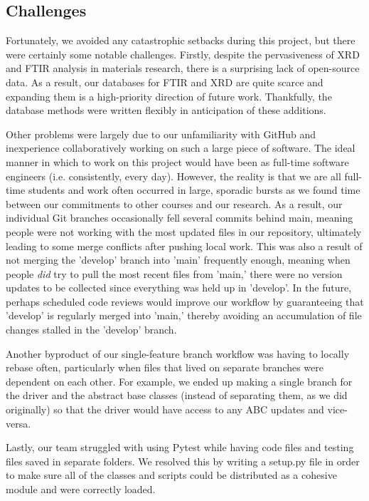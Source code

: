 \documentclass{dhbenelux}
\begin{document}
\subsection{Challenges} \label{challenges}

Fortunately, we avoided any catastrophic setbacks during this project, but there were certainly some notable challenges. Firstly, despite the pervasiveness of XRD and FTIR analysis in materials research, there is a surprising lack of open-source data. As a result, our databases for FTIR and XRD are quite scarce and expanding them is a high-priority direction of future work. Thankfully, the database methods were written flexibly in anticipation of these additions.

Other problems were largely due to our unfamiliarity with GitHub and inexperience collaboratively working on such a large piece of software. The ideal manner in which to work on this project would have been as full-time software engineers (i.e. consistently, every day). However, the reality is that we are all full-time students and work often occurred in large, sporadic bursts as we found time between our commitments to other courses and our research. As a result, our individual Git branches occasionally fell several commits behind main, meaning people were not working with the most updated files in our repository, ultimately leading to some merge conflicts after pushing local work. This was also a result of not merging the 'develop' branch into 'main' frequently enough, meaning when people \textit{did} try to pull the most recent files from 'main,' there were no version updates to be collected since everything was held up in 'develop'. In the future, perhaps scheduled code reviews would improve our workflow by guaranteeing that 'develop' is regularly merged into 'main,' thereby avoiding an accumulation of file changes stalled in the 'develop' branch. 

Another byproduct of our single-feature branch workflow was having to locally rebase often, particularly when files that lived on separate branches were dependent on each other. For example, we ended up making a single branch for the driver and the abstract base classes (instead of separating them, as we did originally) so that the driver would have access to any ABC updates and vice-versa. 

Lastly, our team struggled with using Pytest while having code files and testing files saved in separate folders. We resolved this by writing a setup.py file in order to make sure all of the classes and scripts could be distributed as a cohesive module and were correctly loaded. 
\end{document}
